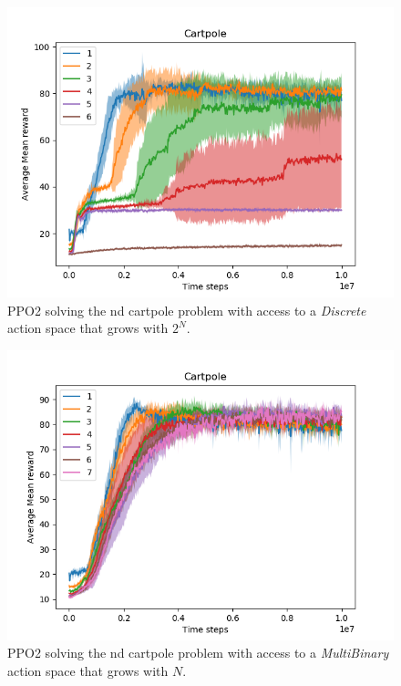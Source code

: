 \begin{figure}
\centering
\includegraphics[width=1\textwidth,height=0.5\textheight]{../../pictures/figures/discrete-nd-cart.png}
\caption{PPO2 solving the nd cartpole problem with access to a \textit{Discrete} action space that grows with $2^N$.}
\end{figure}


\begin{figure}
\centering
\includegraphics[width=1\textwidth,height=0.5\textheight]{../../pictures/figures/multibinary-nd-cart.png}
\caption{PPO2 solving the nd cartpole problem with access to a \textit{MultiBinary} action space that grows with $N$.}
\end{figure}

